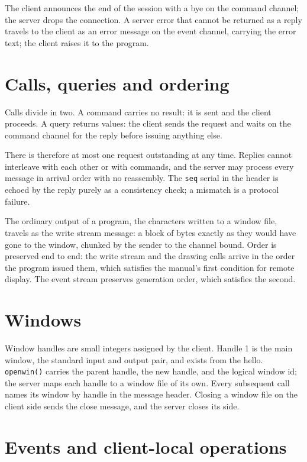 \documentclass[11pt]{article}
\begin{document}
The client announces the end of the session with a bye on the command
channel; the server drops the connection. A server error that cannot be
returned as a reply travels to the client as an error message on the event
channel, carrying the error text; the client raises it to the program.

\section{Calls, queries and ordering}

Calls divide in two. A command carries no result: it is sent and the
client proceeds. A query returns values: the client sends the request and
waits on the command channel for the reply before issuing anything else.

There is therefore at most one request outstanding at any time. Replies
cannot interleave with each other or with commands, and the server may
process every message in arrival order with no reassembly. The
\texttt{seq} serial in the header is echoed by the reply purely as a
consistency check; a mismatch is a protocol failure.

The ordinary output of a program, the characters written to a window file,
travels as the write stream message: a block of bytes exactly as they
would have gone to the window, chunked by the sender to the channel bound.
Order is preserved end to end: the write stream and the drawing calls
arrive in the order the program issued them, which satisfies the manual's
first condition for remote display. The event stream preserves generation
order, which satisfies the second.

\section{Windows}

Window handles are small integers assigned by the client. Handle 1 is the
main window, the standard input and output pair, and exists from the
hello. \texttt{openwin()} carries the parent handle, the new handle, and
the logical window id; the server maps each handle to a window file of its
own. Every subsequent call names its window by handle in the message
header. Closing a window file on the client side sends the close message,
and the server closes its side.

\section{Events and client-local operations}
\end{document}
